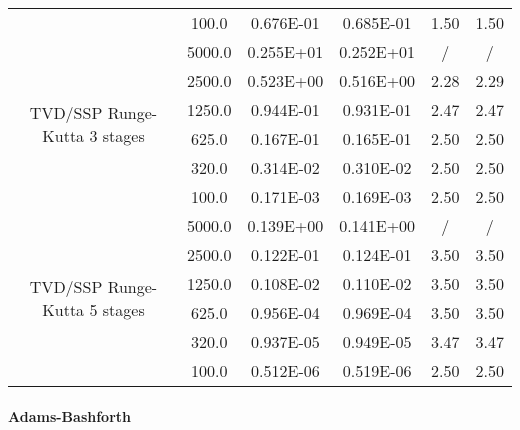 \documentclass[pdftex,preprint,3p,times,numbers]{elsarticle}
\begin{document}
\begin{table}[!ht]
{\begin{tabular}{cccccc}
                 &    100.0        &  0.676E-01    &  0.685E-01    & 1.50          & 1.50          \\
    \cmidrule{2-6}
    \multirow{6}{*}{TVD/SSP Runge-Kutta 3 stages}
                 &   5000.0        &  0.255E+01    &  0.252E+01    & /             & /             \\
                 &   2500.0        &  0.523E+00    &  0.516E+00    & 2.28          & 2.29          \\
                 &   1250.0        &  0.944E-01    &  0.931E-01    & 2.47          & 2.47          \\
                 &    625.0        &  0.167E-01    &  0.165E-01    & 2.50          & 2.50          \\
                 &    320.0        &  0.314E-02    &  0.310E-02    & 2.50          & 2.50          \\
                 &    100.0        &  0.171E-03    &  0.169E-03    & 2.50          & 2.50          \\
    \cmidrule{2-6}
    \multirow{6}{*}{TVD/SSP Runge-Kutta 5 stages}
                 &   5000.0        &  0.139E+00    &  0.141E+00    & /             & /             \\
                 &   2500.0        &  0.122E-01    &  0.124E-01    & 3.50          & 3.50          \\
                 &   1250.0        &  0.108E-02    &  0.110E-02    & 3.50          & 3.50          \\
                 &    625.0        &  0.956E-04    &  0.969E-04    & 3.50          & 3.50          \\
                 &    320.0        &  0.937E-05    &  0.949E-05    & 3.47          & 3.47          \\
                 &    100.0        &  0.512E-06    &  0.519E-06    & 2.50          & 2.50          \\
    \bottomrule
  \end{tabular}}
\end{table}

\paragraph{Adams-Bashforth}
\end{document}
